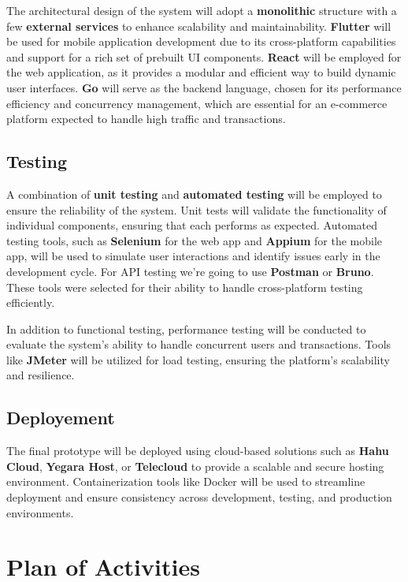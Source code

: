 \documentclass[12pt]{report}
\begin{document}
The architectural design of the system will adopt a \textbf{monolithic} structure with a few \textbf{external services} to enhance
scalability and maintainability. \textbf{Flutter} will be used for mobile application development due
to its cross-platform capabilities and support for a rich set of prebuilt UI components. \textbf{React}
will be employed for the web application, as it provides a modular and efficient way to build
dynamic user interfaces. \textbf{Go} will serve as the backend language, chosen for its
performance efficiency and concurrency management, which are essential for an e-commerce
platform expected to handle high traffic and transactions.

\subsection{Testing}

A combination of \textbf{unit testing} and \textbf{automated testing} will be employed to ensure the
reliability of the system. Unit tests will validate the functionality of individual components,
ensuring that each performs as expected. Automated testing tools, such as \textbf{Selenium} for the
web app and \textbf{Appium} for the mobile app, will be used to simulate user interactions and
identify issues early in the development cycle. For API testing we’re going to use \textbf{Postman}
or \textbf{Bruno}. These tools were selected for their ability to handle cross-platform testing
efficiently\cite{c1201}\cite{c1202}.

In addition to functional testing, performance testing will be conducted to evaluate the
system’s ability to handle concurrent users and transactions. Tools like \textbf{JMeter} will be
utilized for load testing, ensuring the platform’s scalability and resilience.

\subsection{Deployement}

The final prototype will be deployed using cloud-based solutions such as \textbf{Hahu Cloud},
\textbf{Yegara Host}, or \textbf{Telecloud} to provide a scalable and secure hosting environment. Containerization
tools like Docker will be used to streamline deployment and ensure consistency across
development, testing, and production environments.

\section{Plan of Activities}
\end{document}

